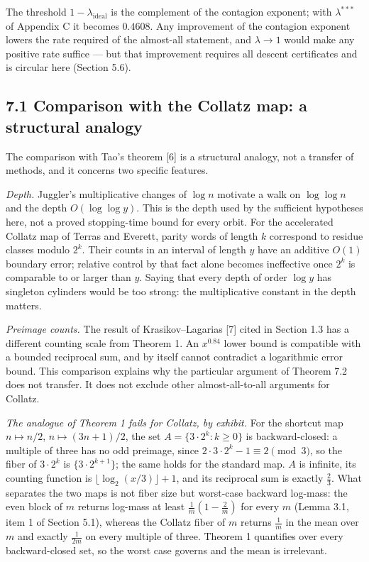 \documentclass[11pt,a4paper]{article}
\begin{document}
The threshold \(1-\lambda_{\mathrm{ideal}}\) is the complement of the
contagion exponent; with \(\lambda^{***}\) of Appendix C it becomes
\(0.4608\). Any improvement of the contagion exponent lowers the rate
required of the almost-all statement, and \(\lambda\to 1\) would make
any positive rate suffice --- but that improvement requires all descent
certificates and is circular here (Section 5.6).

\subsection{7.1 Comparison with the Collatz map: a structural
analogy}\label{comparison-with-the-collatz-map-a-structural-analogy}

The comparison with Tao's theorem {[}6{]} is a structural analogy, not a
transfer of methods, and it concerns two specific features.

\emph{Depth.} Juggler's multiplicative changes of \(\log n\) motivate a
walk on \(\log\log n\) and the depth \(O(\log\log y)\). This is the
depth used by the sufficient hypotheses here, not a proved stopping-time
bound for every orbit. For the accelerated Collatz map of Terras and
Everett, parity words of length \(k\) correspond to residue classes
modulo \(2^k\). Their counts in an interval of length \(y\) have an
additive \(O(1)\) boundary error; relative control by that fact alone
becomes ineffective once \(2^k\) is comparable to or larger than \(y\).
Saying that every depth of order \(\log y\) has singleton cylinders
would be too strong: the multiplicative constant in the depth matters.

\emph{Preimage counts.} The result of Krasikov--Lagarias {[}7{]} cited
in Section 1.3 has a different counting scale from Theorem 1. An
\(x^{0.84}\) lower bound is compatible with a bounded reciprocal sum,
and by itself cannot contradict a logarithmic error bound. This
comparison explains why the particular argument of Theorem 7.2 does not
transfer. It does not exclude other almost-all-to-all arguments for
Collatz.

\emph{The analogue of Theorem 1 fails for Collatz, by exhibit.} For the
shortcut map \(n\mapsto n/2\), \(n\mapsto(3n+1)/2\), the set
\(A=\{3\cdot2^k:k\ge0\}\) is backward-closed: a multiple of three has no
odd preimage, since \(2\cdot3\cdot2^k-1\equiv2\pmod3\), so the fiber of
\(3\cdot2^k\) is \(\{3\cdot2^{k+1}\}\); the same holds for the standard
map. \(A\) is infinite, its counting function is
\(\lfloor\log_2(x/3)\rfloor+1\), and its reciprocal sum is exactly
\(\tfrac23\). What separates the two maps is not fiber size but
worst-case backward log-mass: the even block of \(m\) returns log-mass
at least \(\tfrac1m(1-\tfrac2m)\) for every \(m\) (Lemma 3.1, item 1 of
Section 5.1), whereas the Collatz fiber of \(m\) returns \(\tfrac1m\) in
the mean over \(m\) and exactly \(\tfrac1{2m}\) on every multiple of
three. Theorem 1 quantifies over every backward-closed set, so the worst
case governs and the mean is irrelevant.
\end{document}
